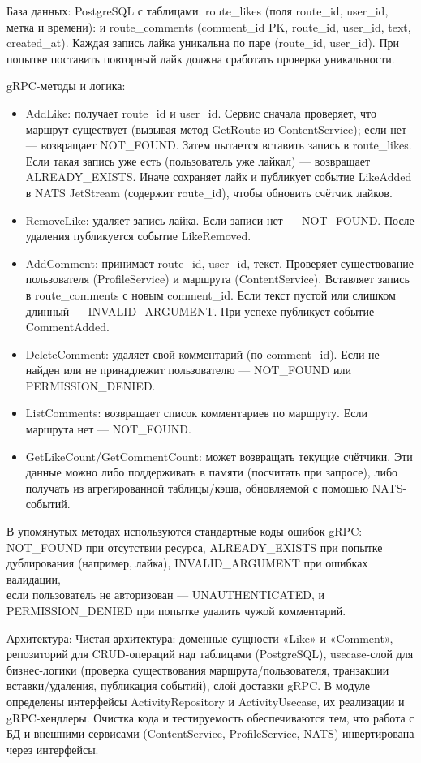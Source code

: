 База данных: PostgreSQL с таблицами: route\_likes (поля route\_id, user\_id, метка и времени): и route\_comments (comment\_id PK, route\_id, user\_id, text, created\_at). Каждая запись лайка уникальна по паре (route\_id, user\_id). При попытке поставить повторный лайк должна сработать проверка уникальности. 

gRPC-методы и логика:
\begin{itemize}
    \item AddLike: получает route\_id и user\_id. Сервис сначала проверяет, что маршрут существует (вызывая метод GetRoute из ContentService); если нет — возвращает NOT\_FOUND. Затем пытается вставить запись в route\_likes. Если такая запись уже есть (пользователь уже лайкал) — возвращает ALREADY\_EXISTS. Иначе сохраняет лайк и публикует событие LikeAdded в NATS JetStream (содержит route\_id), чтобы обновить счётчик лайков.
    \item RemoveLike: удаляет запись лайка. Если записи нет — NOT\_FOUND. После удаления публикуется событие LikeRemoved.
    \item AddComment: принимает route\_id, user\_id, текст. Проверяет существование пользователя (ProfileService) и маршрута (ContentService). Вставляет запись в route\_comments с новым comment\_id. Если текст пустой или слишком длинный — INVALID\_ARGUMENT. При успехе публикует событие CommentAdded.
    \item DeleteComment: удаляет свой комментарий (по comment\_id). Если не найден или не принадлежит пользователю — NOT\_FOUND или \\ PERMISSION\_DENIED.
    \item ListComments: возвращает список комментариев по маршруту. Если маршрута нет — NOT\_FOUND.
    \item GetLikeCount/GetCommentCount: может возвращать текущие счётчики. Эти данные можно либо поддерживать в памяти (посчитать при запросе), либо получать из агрегированной таблицы/кэша, обновляемой с помощью NATS-событий.
\end{itemize}
\noindent В упомянутых методах используются стандартные коды ошибок gRPC: \\ NOT\_FOUND при отсутствии ресурса, ALREADY\_EXISTS при попытке дублирования (например, лайка), INVALID\_ARGUMENT при ошибках валидации, \\ если пользователь не авторизован — UNAUTHENTICATED,  и PERMISSION\_DENIED при попытке удалить чужой комментарий.

Архитектура: Чистая архитектура: доменные сущности «Like» и «Comment», репозиторий для CRUD-операций над таблицами (PostgreSQL), usecase-слой для бизнес-логики (проверка существования маршрута/пользователя, транзакции вставки/удаления, публикация событий), слой доставки gRPC. В модуле определены интерфейсы ActivityRepository и ActivityUsecase, их реализации и gRPC-хендлеры. Очистка кода и тестируемость обеспечиваются тем, что работа с БД и внешними сервисами (ContentService, ProfileService, NATS) инвертирована через интерфейсы.

